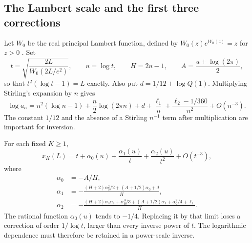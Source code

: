 \documentclass[11pt,letterpaper]{article}
\numberwithin{equation}{section}
\theoremstyle{remark}\newtheorem{remark}[theorem]{Remark}
\begin{document}
\subsection{The Lambert scale and the first three corrections}
Let $W_0$ be the real principal Lambert function, defined by $W_0(z)e^{W_0(z)}=z$ for $z>0$ \cite{dlmfW}. Set
\begin{equation}\label{pwd:dg:eq:t}
 t=\sqrt{\frac{2L}{W_0(2L/e^2)}},\qquad
 u=\log t,\qquad H=2u-1,\qquad A=\frac{u+\log(2\pi)}2,
\end{equation}
so that $t^2(\log t-1)=L$ exactly. Also put $d=1/12+\log Q(1)$. Multiplying Stirling's expansion by $n$ gives
\begin{equation}\label{pwd:dg:eq:logdiag}
 \log a_n=n^2(\log n-1)+\frac n2\log(2\pi n)+d
       +\frac{\ell_1}{n}+\frac{\ell_2-1/360}{n^2}+O(n^{-3}).
\end{equation}
The constant $1/12$ and the absence of a Stirling $n^{-1}$ term after multiplication are important for inversion.

For each fixed $K\ge1$,
\begin{equation}\label{pwd:dg:eq:firstinverse}
 x_K(L)=t+\alpha_0(u)+\frac{\alpha_1(u)}t+\frac{\alpha_2(u)}{t^2}+O(t^{-3}),
\end{equation}
where
\begin{align}
 \alpha_0&=-A/H,\label{pwd:dg:eq:alpha0}\\
 \alpha_1&=-\frac{(H+2)\alpha_0^2/2+(A+1/2)\alpha_0+d}{H},\label{pwd:dg:eq:alpha1}\\
 \alpha_2&=-\frac{(H+2)\alpha_0\alpha_1+\alpha_0^3/3
              +(A+1/2)\alpha_1+\alpha_0^2/4+\ell_1}{H}.\label{pwd:dg:eq:alpha2}
\end{align}
The rational function $\alpha_0(u)$ tends to $-1/4$. Replacing it by that limit loses a correction of order $1/\log t$, larger than every inverse power of $t$. The logarithmic dependence must therefore be retained in a power-scale inverse.
\end{document}
